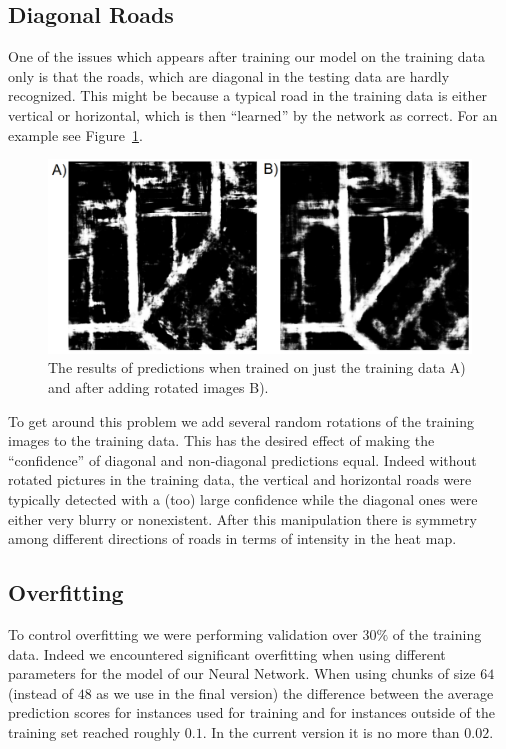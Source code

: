 \documentclass[10pt,conference,compsocconf]{IEEEtran}
\begin{document}
\subsection{Diagonal Roads}
One of the issues which appears after training our model on the training data  only  is that the roads, which are diagonal in the testing data are hardly recognized. This might be because a typical road in the training data is either vertical or horizontal, which is then ``learned'' by the network as correct. For an example see Figure~\ref{fig:diagonal}.
\begin{figure}
\includegraphics[scale=0.3]{diagonal.png}
\caption{The results of predictions when trained on just the training data A) and after adding rotated images B).}
\vspace{2mm}
\label{fig:diagonal}
\end{figure}
To get around this problem we add several random rotations of the training images to the training data. This has the desired effect of making the ``confidence'' of diagonal and non-diagonal predictions equal. Indeed without rotated pictures in the training data, the vertical and horizontal roads were typically detected with a (too) large confidence while the diagonal ones were either very blurry or nonexistent. After this manipulation there is symmetry among different directions of roads in terms of intensity in the heat map.

\subsection{Overfitting}
To control overfitting we were performing validation over $30\%$ of the training data. Indeed we encountered significant overfitting when using different parameters for the model of our Neural Network. When using chunks of size $64$ (instead of $48$ as we use in the final version) the difference between the average prediction scores for instances used for training and for instances outside of the training set reached roughly $0.1$. In the current version it is no more than $0.02$. 
\end{document}
